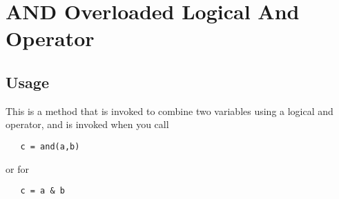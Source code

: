 \section{AND Overloaded Logical And Operator}

\subsection{Usage}

This is a method that is invoked to combine two variables using a
logical and operator, and is invoked when you call
\begin{verbatim}
   c = and(a,b)
\end{verbatim}
or for 
\begin{verbatim}
   c = a & b
\end{verbatim}
